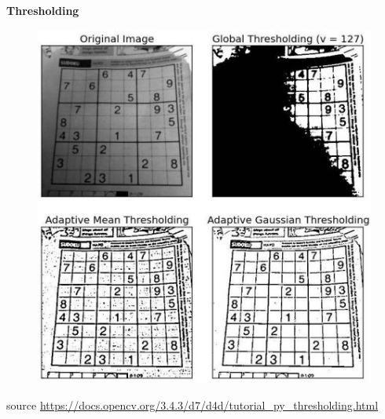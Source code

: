 \documentclass[xcolor=dvipsnames]{beamer}
\begin{document}
\begin{frame}{\bf Thresholding}


\begin{figure}[!htb]
  \centering
  \includegraphics[scale=0.3]{../../pictures/image_processing/ada_threshold.jpg}
\end{figure}

{\tiny source \url{https://docs.opencv.org/3.4.3/d7/d4d/tutorial_py_thresholding.html}}

\end{frame}
\end{document}
